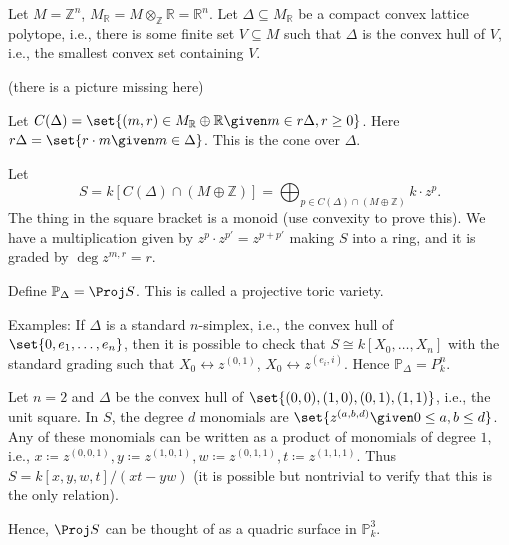 Let $M = \mathbb{Z}^n$, $M_\mathbb{R} = M\otimes_{\mathbb{Z}} \mathbb{R}=\mathbb{R}^n$.
 Let $\Delta \subseteq M_\mathbb{R}$ be a compact convex lattice polytope,
 i.e., there is some finite set $V \subseteq M$ such that $\Delta$ is the convex
 hull of $V$, i.e., the smallest convex set containing $V$.

(there is a picture missing here)

Let $C(\Delta) = \set{(m, r) \in M_\mathbb{R}\oplus \mathbb{R}\given m \in r\Delta, r\geq 0}$.
Here $r\Delta = \set{r\cdot m\given m \in \Delta}$. This is the cone over $\Delta$.

Let \[S = k[C(\Delta)\cap (M\oplus \mathbb{Z})] = \bigoplus_{p \in C(\Delta)\cap(M\oplus \mathbb{Z})}k\cdot z^p .\]
The thing in the square bracket is a monoid (use convexity to prove this).
We have a multiplication given by $z^p \cdot z^{p'} = z^{p + p'}$ making
$S$ into a ring, and it is graded by $\deg z^{m, r} = r$.

Define $\mathbb{P}_{\Delta} = \Proj S$. This is called a projective
toric variety.

Examples: If $\Delta$ is a standard $n$-simplex, i.e., the convex hull of
$\set{0, e_1, \ldots, e_n}$, then it is possible to check that
$S\cong k[X_0, \ldots, X_n]$ with the standard grading such that
$X_0 \leftrightarrow z^{(0, 1)}$, $X_0 \leftrightarrow z^{(e_i, i)}$. Hence
$\mathbb{P}_\Delta = P^n_k$.

Let $n = 2$ and $\Delta$ be the convex hull of $\set{(0, 0), (1, 0), (0, 1), (1, 1)}$,
i.e., the unit square. In $S$, the degree $d$ monomials are $\set{z^{(a, b, d)}\given 0\leq a, b\leq d}$.
Any of these monomials can be written as a product of monomials of degree $1$, i.e.,
$x\coloneqq z^{(0, 0, 1)}, y\coloneqq z^{(1, 0, 1)}, w\coloneqq z^{(0, 1, 1)}, t\coloneqq z^{(1, 1, 1)}$.
Thus $S = k[x, y, w, t]/(xt-yw)$ (it is possible but nontrivial to verify that this is
the only relation).

Hence, $\Proj S$ can be thought of as a quadric surface in $\mathbb{P}^3_k$.

